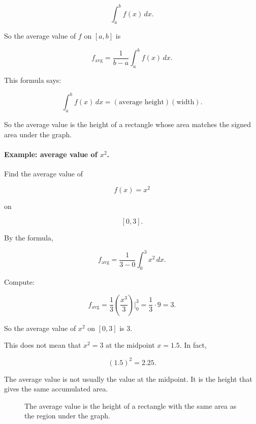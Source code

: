 \[
\int_a^b f(x)\,dx.
\]

So the average value of \(f\) on \([a,b]\) is

\[
\boxed{
f_{\text{avg}}
=
\frac1{b-a}\int_a^b f(x)\,dx.
}
\]

This formula says:

\[
\boxed{
\int_a^b f(x)\,dx
=
(\text{average height})(\text{width}).
}
\]

So the average value is the height of a rectangle whose area matches the signed area
under the graph.

\paragraph{Example: average value of \(x^2\).}
Find the average value of

\[
f(x)=x^2
\]

on

\[
[0,3].
\]

By the formula,

\[
f_{\text{avg}}
=
\frac1{3-0}\int_0^3 x^2\,dx.
\]

Compute:

\[
f_{\text{avg}}
=
\frac13\left(\frac{x^3}{3}\right)\Big|_0^3
=
\frac13\cdot 9
=
\boxed{3}.
\]

So the average value of \(x^2\) on \([0,3]\) is \(3\).

This does not mean that \(x^2=3\) at the midpoint \(x=1.5\).  In fact,

\[
(1.5)^2=2.25.
\]

The average value is not usually the value at the midpoint.  It is the height that gives
the same accumulated area.

\begin{figure}[h]
\centering
{}
\caption{The average value is the height of a rectangle with the same area as the region under the graph.}
\label{fig:average-value-x-squared}
\end{figure}

